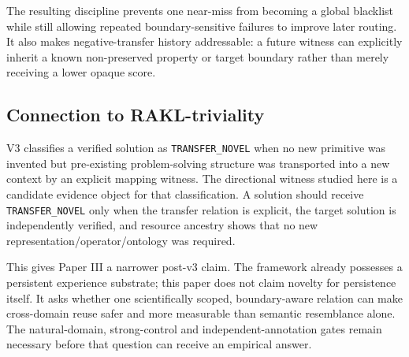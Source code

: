 The resulting discipline prevents one near-miss from becoming a global blacklist while still allowing repeated boundary-sensitive failures to improve later routing. It also makes negative-transfer history addressable: a future witness can explicitly inherit a known non-preserved property or target boundary rather than merely receiving a lower opaque score.

\subsection{Connection to RAKL-triviality}
V3 classifies a verified solution as \texttt{TRANSFER\_NOVEL} when no new primitive was invented but pre-existing problem-solving structure was transported into a new context by an explicit mapping witness. The directional witness studied here is a candidate evidence object for that classification. A solution should receive \texttt{TRANSFER\_NOVEL} only when the transfer relation is explicit, the target solution is independently verified, and resource ancestry shows that no new representation/operator/ontology was required.

This gives Paper III a narrower post-v3 claim. The framework already possesses a persistent experience substrate; this paper does not claim novelty for persistence itself. It asks whether one scientifically scoped, boundary-aware relation can make cross-domain reuse safer and more measurable than semantic resemblance alone. The natural-domain, strong-control and independent-annotation gates remain necessary before that question can receive an empirical answer.

